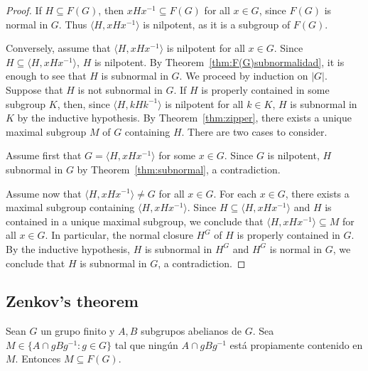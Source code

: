 \begin{proof}
	If $H\subseteq F(G)$, then $xHx^{-1}\subseteq F(G)$ for all $x\in G$, since 
	$F(G)$ is normal in $G$. Thus $\langle H,xHx^{-1}\rangle$ is nilpotent, 
    as it is a subgroup of $F(G)$.

	Conversely, assume that $\langle H,xHx^{-1}\rangle$ is nilpotent for all  $x\in
	G$. Since $H\subseteq \langle H,xHx^{-1}\rangle$, $H$ is nilpotent. By Theorem~\ref{thm:F(G)subnormalidad}, 
    it is enough to see that $H$ is subnormal in $G$. We proceed by induction on $|G|$. 
	Suppose that $H$ is not subnormal in $G$. If 
	$H$ is properly contained in some subgroup $K$, then, since 
	$\langle H,kHk^{-1}\rangle$ is nilpotent for all $k\in K$, $H$ is 
	subnormal in $K$ by the inductive hypothesis. By Theorem~\ref{thm:zipper}, 
    there exists a unique maximal subgroup $M$ of $G$ containing $H$. 
	There are two cases to consider.
    
    Assume first that $G=\langle H,xHx^{-1}\rangle$
	for some $x\in G$. Since $G$ is nilpotent, $H$ subnormal in $G$ by Theorem~\ref{thm:subnormal}, a contradiction. 
	
    Assume now that $\langle H,xHx^{-1}\rangle\ne G$ for all $x\in G$. For each 
	$x\in G$, there exists a maximal subgroup containing $\langle
	H,xHx^{-1}\rangle$. Since $H\subseteq \langle H,xHx^{-1}\rangle$ and $H$
	is contained in a unique maximal subgroup, we conclude that $\langle
	H,xHx^{-1}\rangle\subseteq M$ for all $x\in G$. In particular, the normal closure 
	$H^G$ of $H$ is properly contained in $G$. By the inductive hypothesis, 
	$H$ is subnormal in $H^G$ and $H^G$ is normal in $G$, we conclude that 
	$H$ is subnormal in $G$, a contradiction. 
\end{proof}

\subsection{Zenkov's theorem}

\begin{theorem}[Zenkov]
	\label{theorem:Zenkov}
	Sean $G$ un grupo finito y $A,B$ subgrupos abelianos de $G$. Sea 
	$M\in\{A\cap gBg^{-1}:g\in G\}$ tal que ningún $A\cap gBg^{-1}$ está propiamente
	contenido en $M$. Entonces $M\subseteq F(G)$.
\end{theorem}

